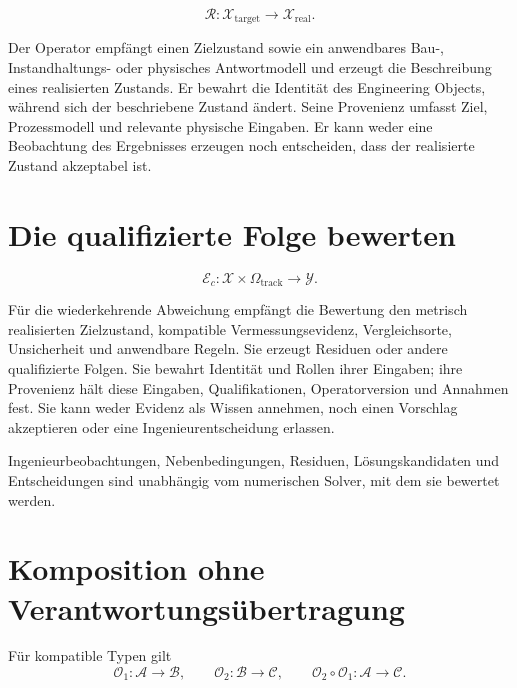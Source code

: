 \begin{definition}[Realisierungsoperator]
\label{def:realization-operator}
\[
\mathcal R:
\mathcal X_{\mathrm{target}}\rightarrow\mathcal X_{\mathrm{real}}.
\]
\end{definition}

Der Operator empfängt einen Zielzustand sowie ein anwendbares Bau-,
Instandhaltungs- oder physisches Antwortmodell und erzeugt die Beschreibung
eines realisierten Zustands. Er bewahrt die Identität des Engineering Objects,
während sich der beschriebene Zustand ändert. Seine Provenienz umfasst Ziel,
Prozessmodell und relevante physische Eingaben. Er kann weder eine Beobachtung
des Ergebnisses erzeugen noch entscheiden, dass der realisierte Zustand
akzeptabel ist.

\section{Die qualifizierte Folge bewerten}

\begin{definition}[Bewertungsoperator]
\label{def:evaluation-operator}
\[
\mathcal E_c:
\mathcal X\times\Omega_{\mathrm{track}}\rightarrow\mathcal Y.
\]
\end{definition}

Für die wiederkehrende Abweichung empfängt die Bewertung den metrisch
realisierten Zielzustand, kompatible Vermessungsevidenz, Vergleichsorte,
Unsicherheit und anwendbare Regeln. Sie erzeugt Residuen oder andere
qualifizierte Folgen. Sie bewahrt Identität und Rollen ihrer Eingaben; ihre
Provenienz hält diese Eingaben, Qualifikationen, Operatorversion und Annahmen
fest. Sie kann weder Evidenz als Wissen annehmen, noch einen Vorschlag
akzeptieren oder eine Ingenieurentscheidung erlassen.

\begin{principle}
\label{princ:operators-solver-independence}
Ingenieurbeobachtungen, Nebenbedingungen, Residuen, Lösungskandidaten und
Entscheidungen sind unabhängig vom numerischen Solver, mit dem sie bewertet
werden.
\end{principle}

\section{Komposition ohne Verantwortungsübertragung}

Für kompatible Typen gilt
\[
\mathcal O_1:\mathcal A\rightarrow\mathcal B,
\qquad
\mathcal O_2:\mathcal B\rightarrow\mathcal C,
\qquad
\mathcal O_2\circ\mathcal O_1:
\mathcal A\rightarrow\mathcal C.
\]

